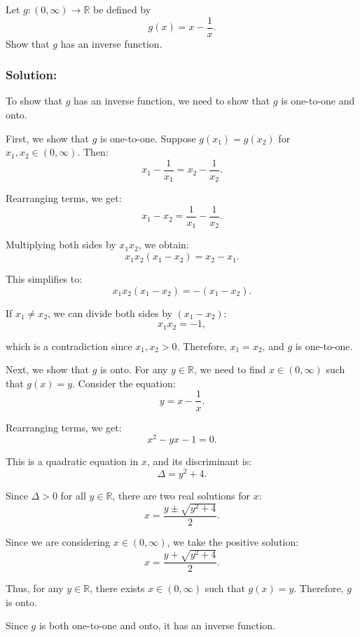 \documentclass{article}
\begin{document}
Let $g : (0,\infty) \to \mathbb{R}$ be defined by
\[ g(x) = x - \frac{1}{x}. \]
Show that $g$ has an inverse function.

\subsubsection*{Solution:}

To show that $g$ has an inverse function, we need to show that $g$ is one-to-one and onto.

First, we show that $g$ is one-to-one. Suppose $g(x_1) = g(x_2)$ for $x_1, x_2 \in (0, \infty)$. Then:
\[ x_1 - \frac{1}{x_1} = x_2 - \frac{1}{x_2}. \]

Rearranging terms, we get:
\[ x_1 - x_2 = \frac{1}{x_1} - \frac{1}{x_2}. \]

Multiplying both sides by $x_1 x_2$, we obtain:
\[ x_1 x_2 (x_1 - x_2) = x_2 - x_1. \]

This simplifies to:
\[ x_1 x_2 (x_1 - x_2) = -(x_1 - x_2). \]

If $x_1 \neq x_2$, we can divide both sides by $(x_1 - x_2)$:
\[ x_1 x_2 = -1, \]

which is a contradiction since $x_1, x_2 > 0$. Therefore, $x_1 = x_2$, and $g$ is one-to-one.

Next, we show that $g$ is onto. For any $y \in \mathbb{R}$, we need to find $x \in (0, \infty)$ such that $g(x) = y$. Consider the equation:
\[ y = x - \frac{1}{x}. \]

Rearranging terms, we get:
\[ x^2 - yx - 1 = 0. \]

This is a quadratic equation in $x$, and its discriminant is:
\[ \Delta = y^2 + 4. \]

Since $\Delta > 0$ for all $y \in \mathbb{R}$, there are two real solutions for $x$:
\[ x = \frac{y \pm \sqrt{y^2 + 4}}{2}. \]

Since we are considering $x \in (0, \infty)$, we take the positive solution:
\[ x = \frac{y + \sqrt{y^2 + 4}}{2}. \]

Thus, for any $y \in \mathbb{R}$, there exists $x \in (0, \infty)$ such that $g(x) = y$. Therefore, $g$ is onto.

Since $g$ is both one-to-one and onto, it has an inverse function.
\end{document}
